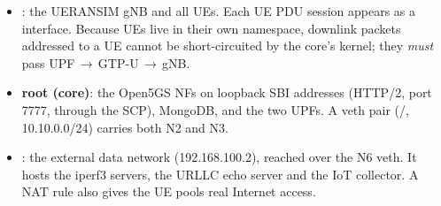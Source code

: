 \begin{itemize}
\item \textbf{}: the UERANSIM gNB and all UEs. Each UE PDU session appears as a
   interface. Because UEs live in their own namespace, downlink packets
  addressed to a UE cannot be short-circuited by the core's kernel; they \emph{must} pass
  UPF\,$\rightarrow$\,GTP-U\,$\rightarrow$\,gNB.
\item \textbf{root (core)}: the Open5GS NFs on loopback SBI addresses (HTTP/2, port 7777,
  through the SCP), MongoDB, and the two UPFs. A veth pair (/,
  10.10.0.0/24) carries both N2 and N3.
\item \textbf{}: the external data network (192.168.100.2), reached over the N6 veth.
  It hosts the iperf3 servers, the URLLC echo server and the IoT collector. A NAT rule also
  gives the UE pools real Internet access.
\end{itemize}

